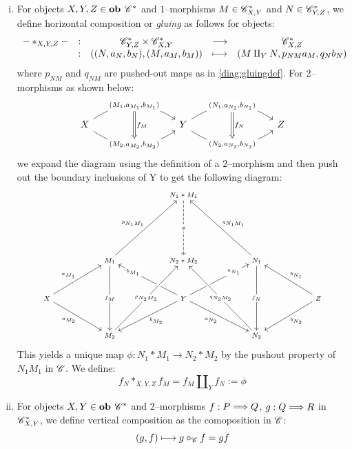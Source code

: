 \documentclass[./Thick_TQFTs_and_Quantum_Information.tex]{subfiles}
\begin{document}
\begin{enumerate}[(i)]
\item For objects $X, Y, Z \in \textbf{ob } \mathscr{C}^*$ and $1$--morphisms
$M \in \mathscr{C}^*_{X, Y}$ and $N \in \mathscr{C}^*_{Y, Z}$, we define horizontal
composition or \textit{gluing} as follows for objects:
\[\begin{array}{ccccc}
  - *_{X, Y, Z} -
  &:& \mathscr{C}^*_{Y, Z} \times \mathscr{C}^*_{X, Y}
  &  \stackrel{}{\longrightarrow}
  &  \mathscr{C}^*_{X, Z} \\
  &:& ((N, a_N, b_N), (M, a_M, b_M))
  &  \longmapsto
  &  (M \amalg_{Y} N, p_{NM}a_M, q_{N}b_N)
\end{array}\]
where $p_{NM}$ and $q_{NM}$ are pushed-out maps as in \eqref{diag:gluingdef}.
For $2$--morphisms as shown below:
\begin{equation}
\begin{tikzcd}[column sep=85]
  X \arrow[r, bend left=35,
          "{(M_1, a_{M_1}, b_{M_1})}"{name=M1, description}]
    \arrow[r, bend right=35,
          "{(M_2, a_{M_2}, b_{M_2})}"{name=M2, description}] &
  Y \arrow[r, bend left=35,
          "{(N_1, a_{N_1}, b_{N_1})}"{name=N1, description}]
    \arrow[r, bend right=35,
          "{(N_2, a_{N_2}, b_{N_2})}"{name=N2, description}] &
  Z
  \arrow[Rightarrow, from=M1, to=M2, "f_M"]
  \arrow[Rightarrow, from=N1, to=N2, "f_N"]
\end{tikzcd}
\end{equation}
we expand the diagram using the definition of a $2$--morphism and then push out
the boundary inclusions of Y to get the following diagram:
\begin{equation}\label{diag:horizontalcomp}
\begin{scriptsize}
\begin{tikzcd}[column sep=50, row sep=huge]
  & &
  N_1 * M_1 \arrow[dd, "\phi" description, dashed] & & \\
  & & & & \\&
  M_1 \arrow[ruu, "p_{N_1M_1}" above left] \arrow[dd, "f_M" description] &
  N_2 * M_2 &
  N_1 \arrow[luu, "q_{N_1M_1}" above right] \arrow[dd, "f_N" description] & \\
  X \arrow[ru, "a_{M_1}"] \arrow[rd, "a_{M_2}" below left] & &
  Y \arrow[ru, "a_{N_1}" description, near end]
    \arrow[lu, "b_{M_1}" description, near end]
    \arrow[ld, "b_{M_2}" below right]
    \arrow[rd, "a_{N_2}" below left] & &
  Z \arrow[lu, "b_{N_1}" above right] \arrow[ld, "b_{N_2}" below right] \\ &
  M_2 \arrow[ruu, "p_{N_2M_2}" description, crossing over] & &
  N_2 \arrow[luu, "q_{N_2M_2}" description, crossing over] &
\end{tikzcd}
\end{scriptsize}
\end{equation}
This yields a unique map $\phi : N_1 * M_1 \to N_2 * M_2$ by the pushout
property of $N_1M_1$ in $\mathscr{C}$. We define:
\[
  f_N *_{X, Y, Z} f_M = f_M \amalg_Y f_N := \phi
\]

\item For objects $X, Y \in \textbf{ob } \mathscr{C}^*$ and $2$--morphisms
$f : P \stackrel{}{\Longrightarrow} Q$, $g : Q \stackrel{}{\Longrightarrow} R$ in $\mathscr{C}^*_{X, Y}$, we define vertical
composition as the comoposition in $\mathscr{C}$:
\[
  (g, f) \longmapsto g \circ_{\mathscr{C}} f = gf
\]

\end{enumerate}
\end{document}
